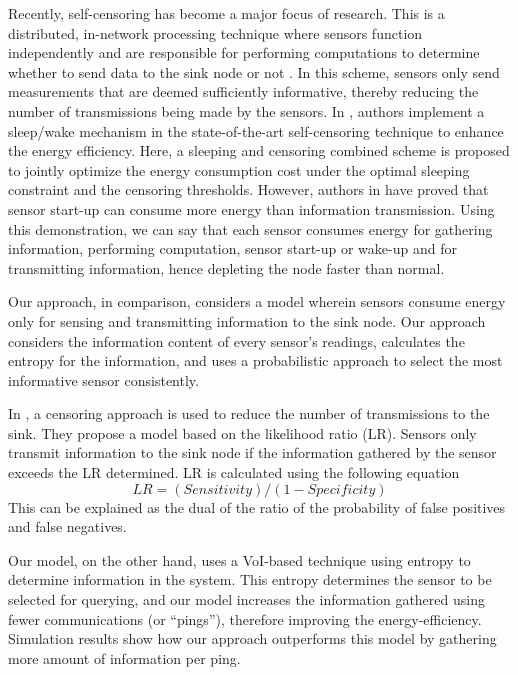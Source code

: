 Recently, self-censoring has become a major focus of research. This is
a distributed, in-network processing technique where sensors function
independently and are responsible for performing computations to
determine whether to send data to the sink node or not
\cite{rago1996censoring} \cite{jiang2005fusion}
\cite{axell2012spectrum}.  In this scheme, sensors only send
measurements that are deemed sufficiently informative, thereby
reducing the number of transmissions being made by the sensors. In
\cite{maleki2011energy}, authors implement a sleep/wake mechanism in
the state-of-the-art self-censoring technique to enhance the energy
efficiency. Here, a sleeping and censoring combined scheme is proposed
to jointly optimize the energy consumption cost under the optimal
sleeping constraint and the censoring thresholds. However, authors in
\cite{cho2001energy} have proved that sensor start-up can consume more
energy than information transmission. Using this demonstration, we can
say that each sensor consumes energy for gathering information,
performing computation, sensor start-up or wake-up and for
transmitting information, hence depleting the node faster than normal.
	
Our approach, in comparison, considers a model wherein sensors consume
energy only for sensing and transmitting information to the sink
node. Our approach considers the information content of every sensor's
readings, calculates the entropy for the information, and uses a
probabilistic approach to select the most informative sensor
consistently.

In \cite{rago1996censoring}, a censoring approach is used to reduce
the number of transmissions to the sink.  They propose a model based
on the likelihood ratio (LR). Sensors only transmit information to the
sink node if the information gathered by the sensor exceeds the LR
determined. LR is calculated using the following equation
\begin{equation}
LR = (Sensitivity) / (1-Specificity) %
\end{equation}
This can be explained as the dual of the ratio of the probability of
false positives and false negatives.

Our model, on the other hand, uses a VoI-based technique using entropy
to determine information in the system. This entropy determines the
sensor to be selected for querying, and our model increases the
information gathered using fewer communications (or ``pings''),
therefore improving the energy-efficiency. Simulation results show how
our approach outperforms this model by gathering more amount of
information per ping.